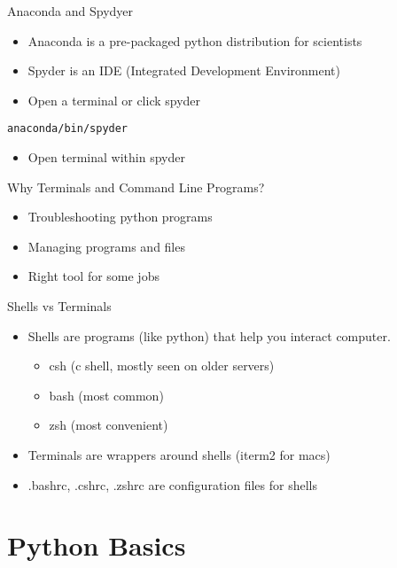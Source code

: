 \documentclass[presentation]{beamer}
\begin{document}
\begin{frame}[fragile,label=sec-3-1]{Anaconda and Spydyer}
 \begin{itemize}
\item Anaconda is a pre-packaged python distribution for scientists
\item Spyder is an IDE (Integrated Development Environment)
\item Open a terminal or click spyder
\end{itemize}

\lstset{numbers=left,language=sh}
\begin{lstlisting}
anaconda/bin/spyder
\end{lstlisting}

\begin{itemize}
\item Open terminal within spyder
\end{itemize}
\end{frame}

\begin{frame}[label=sec-3-2]{Why Terminals and Command Line Programs?}
\begin{itemize}
\item Troubleshooting python programs
\item Managing programs and files
\item Right tool for some jobs
\end{itemize}
\end{frame}
\begin{frame}[label=sec-3-3]{Shells vs Terminals}
\begin{itemize}
\item Shells are programs (like python) that help you interact computer.
\begin{itemize}
\item csh (c shell, mostly seen on older servers)
\item bash (most common)
\item zsh (most convenient)
\end{itemize}
\item Terminals are wrappers around shells (iterm2 for macs)
\item .bashrc, .cshrc, .zshrc are configuration files for shells
\end{itemize}
\end{frame}
\begin{frame}[label=sec-3-4]{}
\end{frame}
\section{Python Basics}
\label{sec-4}
\end{document}

